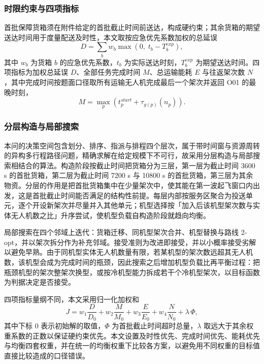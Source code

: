 \documentclass[bwprint]{gmcmthesis}
\begin{document}
\subsubsection{时限约束与四项指标}
首批保障货箱须在附件给定的首批截止时间前送达，构成硬约束；其余货箱的期望送达时间用于度量配送及时性，本文取按应急优先系数加权的总延误
\begin{equation}
D=\sum_{b}w_b\max\left(0,\;t_b-T_b^{exp}\right),
\label{eq:tardy}
\end{equation}
其中 $w_b$ 为货箱 $b$ 的应急优先系数，$t_b$ 为实际送达时刻，$T_b^{exp}$ 为期望送达时间。四项指标为加权总延误 $D$、全部任务完成时间 $M$、总运输能耗 $E$ 与往返架次数 $N$，其中完成时间按题面口径取所有运输无人机完成最后一个架次并返回 O01 的最晚时刻，
\begin{equation}
M=\max_{p}\left(t_p^{start}+\tau_{g(p)}\!\left(n_p\right)\right).
\label{eq:makespan}
\end{equation}

\subsubsection{分层构造与局部搜索}
本问的决策空间包含划分、排序、指派与排程四个层次，属于带时间窗与资源周转的异构多行程路径问题，精确求解在给定规模下不可行，故采用分层构造与局部搜索相结合的算法。构造阶段按截止时间把货箱分为三层，第一层为截止时间 3600 s 的首批货箱，第二层为截止时间 7200 s 与 10800 s 的首批货箱，第三层为其余物资。分层的作用是把首批货箱集中在少量架次中，使其能在第一波起飞窗口内出发，这是首批截止时间能否满足的结构性前提。每层内部按服务区聚合为投送单元，逐个开设新架次并尽量并入其他单元；机型选择按「加入后该机型架次数与实体无人机数之比」升序尝试，使机型负载自构造阶段就趋向均衡。

局部搜索在四个邻域上迭代：货箱迁移、同机型架次合并、机型替换与路线 2-opt，并以架次拆分作为补充邻域。接受准则为改进即接受，并以小概率接受劣解以避免早熟。由于同机型实体无人机数量有限，若某机型的架次数远超其无人机数，该机型会成为完成时间的瓶颈，因此搜索之后增加机型负载比再平衡过程：把瓶颈机型的架次整架次换型，或按冷机型能力拆成若干个冷机型架次，以目标函数为判据决定是否接受。

四项指标量纲不同，本文采用归一化加权和
\begin{equation}
J=w_1\frac{D}{D_0}+w_2\frac{M}{M_0}+w_3\frac{E}{E_0}+w_4\frac{N}{N_0}+\lambda\,\Phi,
\label{eq:q2obj}
\end{equation}
其中下标 $0$ 表示初始解的取值，$\Phi$ 为首批截止时间超时总量，$\lambda$ 取远大于其余权重系数的正数以保证硬约束优先。本文设置及时性优先、完成时间优先、能耗优先与均衡四套权重，并在统一的均衡权重下比较各方案，以避免用不同权重的目标值直接比较造成的口径错误。
\end{document}
